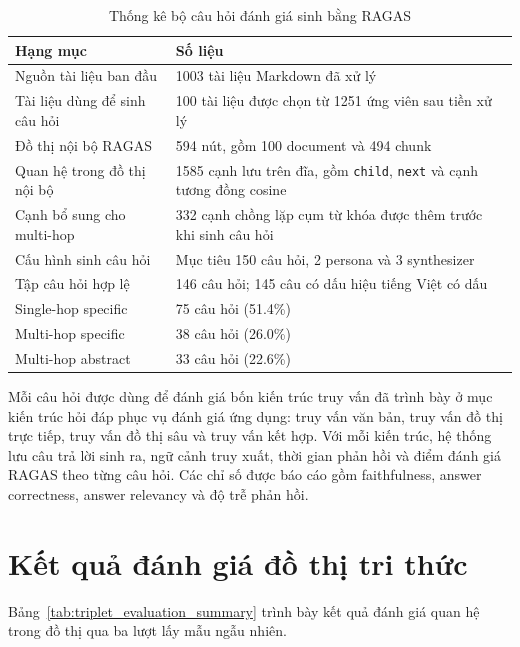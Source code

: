 \begin{table}[h]
\centering
\caption{Thống kê bộ câu hỏi đánh giá sinh bằng RAGAS}
\label{tab:ragas_testset_stats}
\renewcommand{\arraystretch}{1.18}
\begin{tabularx}{\textwidth}{|p{}|X|}
\hline
\textbf{Hạng mục} & \textbf{Số liệu} \\
\hline
Nguồn tài liệu ban đầu & 1003 tài liệu Markdown đã xử lý \\
\hline
Tài liệu dùng để sinh câu hỏi & 100 tài liệu được chọn từ 1251 ứng viên sau tiền xử lý \\
\hline
Đồ thị nội bộ RAGAS & 594 nút, gồm 100 document và 494 chunk \\
\hline
Quan hệ trong đồ thị nội bộ & 1585 cạnh lưu trên đĩa, gồm \texttt{child}, \texttt{next} và cạnh tương đồng cosine \\
\hline
Cạnh bổ sung cho multi-hop & 332 cạnh chồng lặp cụm từ khóa được thêm trước khi sinh câu hỏi \\
\hline
Cấu hình sinh câu hỏi & Mục tiêu 150 câu hỏi, 2 persona và 3 synthesizer \\
\hline
Tập câu hỏi hợp lệ & 146 câu hỏi; 145 câu có dấu hiệu tiếng Việt có dấu \\
\hline
Single-hop specific & 75 câu hỏi (51.4\%) \\
\hline
Multi-hop specific & 38 câu hỏi (26.0\%) \\
\hline
Multi-hop abstract & 33 câu hỏi (22.6\%) \\
\hline
\end{tabularx}
\end{table}

Mỗi câu hỏi được dùng để đánh giá bốn kiến trúc truy vấn đã trình bày ở mục kiến trúc hỏi đáp phục vụ đánh giá ứng dụng: truy vấn văn bản, truy vấn đồ thị trực tiếp, truy vấn đồ thị sâu và truy vấn kết hợp. Với mỗi kiến trúc, hệ thống lưu câu trả lời sinh ra, ngữ cảnh truy xuất, thời gian phản hồi và điểm đánh giá RAGAS theo từng câu hỏi. Các chỉ số được báo cáo gồm faithfulness, answer correctness, answer relevancy và độ trễ phản hồi.

\section{Kết quả đánh giá đồ thị tri thức}

Bảng~\ref{tab:triplet_evaluation_summary} trình bày kết quả đánh giá quan hệ trong đồ thị qua ba lượt lấy mẫu ngẫu nhiên.

